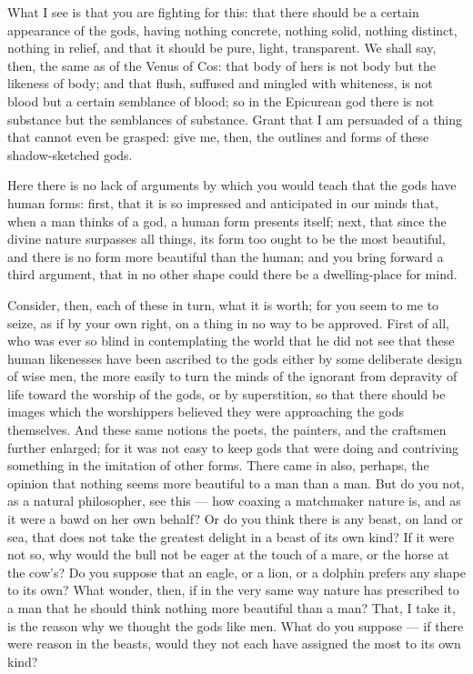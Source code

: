  What I see is that you are fighting for this: that there should be a certain appearance of the gods, having nothing concrete, nothing solid, nothing distinct, nothing in relief, and that it should be pure, light, transparent. We shall say, then, the same as of the Venus of Cos: that body of hers is not body but the likeness of body; and that flush, suffused and mingled with whiteness, is not blood but a certain semblance of blood; so in the Epicurean god there is not substance but the semblances of substance. Grant that I am persuaded of a thing that cannot even be grasped: give me, then, the outlines and forms of these shadow-sketched gods.

 Here there is no lack of arguments by which you would teach that the gods have human forms: first, that it is so impressed and anticipated in our minds that, when a man thinks of a god, a human form presents itself; next, that since the divine nature surpasses all things, its form too ought to be the most beautiful, and there is no form more beautiful than the human; and you bring forward a third argument, that in no other shape could there be a dwelling-place for mind.

 Consider, then, each of these in turn, what it is worth; for you seem to me to seize, as if by your own right, on a thing in no way to be approved. First of all, who was ever so blind in contemplating the world that he did not see that these human likenesses have been ascribed to the gods either by some deliberate design of wise men, the more easily to turn the minds of the ignorant from depravity of life toward the worship of the gods, or by superstition, so that there should be images which the worshippers believed they were approaching the gods themselves. And these same notions the poets, the painters, and the craftsmen further enlarged; for it was not easy to keep gods that were doing and contriving something in the imitation of other forms. There came in also, perhaps, the opinion that nothing seems more beautiful to a man than a man. But do you not, as a natural philosopher, see this — how coaxing a matchmaker nature is, and as it were a bawd on her own behalf? Or do you think there is any beast, on land or sea, that does not take the greatest delight in a beast of its own kind? If it were not so, why would the bull not be eager at the touch of a mare, or the horse at the cow's? Do you suppose that an eagle, or a lion, or a dolphin prefers any shape to its own? What wonder, then, if in the very same way nature has prescribed to a man that he should think nothing more beautiful than a man? That, I take it, is the reason why we thought the gods like men. What do you suppose — if there were reason in the beasts, would they not each have assigned the most to its own kind?


